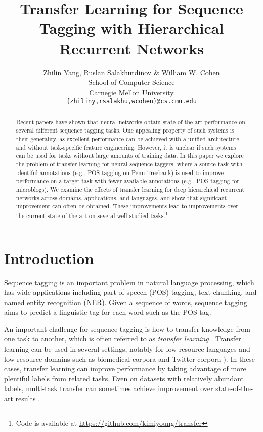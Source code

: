 \documentclass{article} \usepackage{iclr2017_conference,times}
\title{Transfer Learning for Sequence Tagging with Hierarchical Recurrent Networks}
\author{Zhilin Yang, Ruslan Salakhutdinov \& William W. Cohen \\
School of Computer Science\\
Carnegie Mellon University\\
\texttt{\{zhiliny,rsalakhu,wcohen\}@cs.cmu.edu}
}
\begin{document}
\maketitle


\begin{abstract}


Recent papers have shown that neural networks obtain state-of-the-art performance on several different sequence tagging tasks. One appealing property of such systems is their generality, as excellent performance can be achieved with a unified architecture and without task-specific feature engineering.  However, it is unclear if such systems can be used for tasks without large amounts of training data. In this paper we explore the problem of transfer learning for neural sequence taggers, where a source task with plentiful annotations (e.g., POS tagging on Penn Treebank) is used to improve performance on a target task with fewer available annotations (e.g., POS tagging for microblogs). We examine the effects of transfer learning for deep hierarchical recurrent networks across domains, applications, and languages, and show that significant improvement can often be obtained.  These improvements lead to improvements over the current state-of-the-art on several well-studied tasks.\footnote{Code is available at \url{https://github.com/kimiyoung/transfer}}

\end{abstract}
 
\section{Introduction}

Sequence tagging is an important problem in natural language processing, which has wide applications including part-of-speech (POS) tagging, text chunking, and named entity recognition (NER).  Given a sequence of words, sequence tagging aims to predict a linguistic tag for each word such as the POS tag.

An important challenge for sequence tagging is how to transfer knowledge from one task to another, which is often referred to as \textit{transfer learning} \citep{pan2010survey}.
Transfer learning can be used in several settings, notably for low-resource languages \citep{zirikly2cross,wang2013cross} and low-resource domains such as biomedical corpora \citep{kim2003genia} and Twitter corpora \citep{ritter2011named}). In these cases, transfer learning can improve performance by taking advantage of more plentiful labels from related tasks. Even on datasets with relatively abundant labels, multi-task transfer can sometimes achieve improvement over state-of-the-art results \citep{collobert2011natural}.
\end{document}
